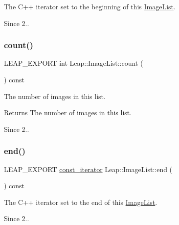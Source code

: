 The C++ iterator set to the beginning of this \hyperlink{class_leap_1_1_image_list}{Image\+List}. \begin{DoxySince}{Since}
2.. 
\end{DoxySince}
\mbox{\label{class_leap_1_1_image_list_ab529e2c3b3381d1195c98379828dce7c}} 
\subsubsection{\texorpdfstring{count()}{count()}}
{\footnotesize\ttfamily L\+E\+A\+P\+\_\+\+E\+X\+P\+O\+RT int Leap\+::\+Image\+List\+::count (\begin{DoxyParamCaption}{ }\end{DoxyParamCaption}) const}

The number of images in this list.

\begin{DoxyReturn}{Returns}
The number of images in this list. 
\end{DoxyReturn}
\begin{DoxySince}{Since}
2.. 
\end{DoxySince}
\mbox{\label{class_leap_1_1_image_list_ae4dac1f27bbc44e654998366c2cb5ff2}} 
\subsubsection{\texorpdfstring{end()}{end()}}
{\footnotesize\ttfamily L\+E\+A\+P\+\_\+\+E\+X\+P\+O\+RT \hyperlink{class_leap_1_1_image_list_ae3c17a6b8ac23853649ba93abd5a1dbe}{const\+\_\+iterator} Leap\+::\+Image\+List\+::end (\begin{DoxyParamCaption}{ }\end{DoxyParamCaption}) const}

The C++ iterator set to the end of this \hyperlink{class_leap_1_1_image_list}{Image\+List}. \begin{DoxySince}{Since}
2.. 
\end{DoxySince}
\mbox{\label{class_leap_1_1_image_list_a0dd50c8397d6e927c6e80fa5f197b1b3}} 
